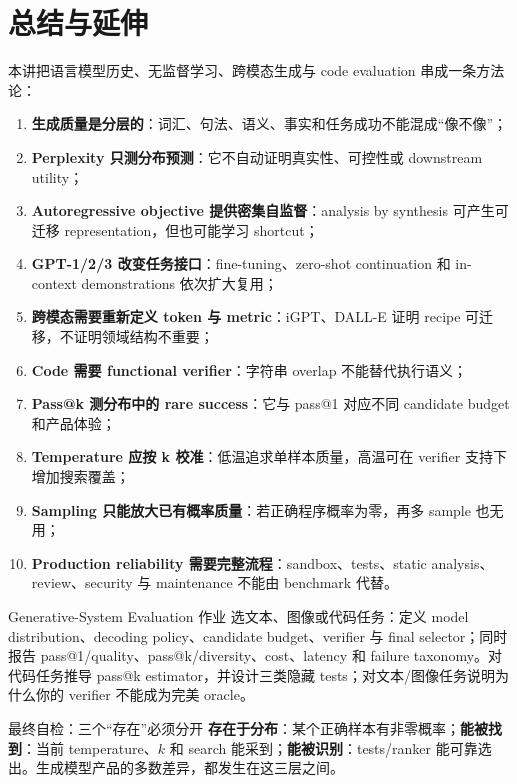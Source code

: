 \section{总结与延伸}

本讲把语言模型历史、无监督学习、跨模态生成与 code evaluation 串成一条方法论：

\begin{enumerate}
  \item \textbf{生成质量是分层的}：词汇、句法、语义、事实和任务成功不能混成“像不像”；
  \item \textbf{Perplexity 只测分布预测}：它不自动证明真实性、可控性或 downstream utility；
  \item \textbf{Autoregressive objective 提供密集自监督}：analysis by synthesis 可产生可迁移 representation，但也可能学习 shortcut；
  \item \textbf{GPT-1/2/3 改变任务接口}：fine-tuning、zero-shot continuation 和 in-context demonstrations 依次扩大复用；
  \item \textbf{跨模态需要重新定义 token 与 metric}：iGPT、DALL-E 证明 recipe 可迁移，不证明领域结构不重要；
  \item \textbf{Code 需要 functional verifier}：字符串 overlap 不能替代执行语义；
  \item \textbf{Pass@k 测分布中的 rare success}：它与 pass@1 对应不同 candidate budget 和产品体验；
  \item \textbf{Temperature 应按 k 校准}：低温追求单样本质量，高温可在 verifier 支持下增加搜索覆盖；
  \item \textbf{Sampling 只能放大已有概率质量}：若正确程序概率为零，再多 sample 也无用；
  \item \textbf{Production reliability 需要完整流程}：sandbox、tests、static analysis、review、security 与 maintenance 不能由 benchmark 代替。
\end{enumerate}

\begin{importantbox}{Generative-System Evaluation 作业}
选文本、图像或代码任务：定义 model distribution、decoding policy、candidate budget、verifier 与 final selector；同时报告 pass@1/quality、pass@k/diversity、cost、latency 和 failure taxonomy。对代码任务推导 pass@k estimator，并设计三类隐藏 tests；对文本/图像任务说明为什么你的 verifier 不能成为完美 oracle。
\end{importantbox}

\begin{knowledgebox}{最终自检：三个“存在”必须分开}
\textbf{存在于分布}：某个正确样本有非零概率；\textbf{能被找到}：当前 temperature、$k$ 和 search 能采到；\textbf{能被识别}：tests/ranker 能可靠选出。生成模型产品的多数差异，都发生在这三层之间。
\end{knowledgebox}

